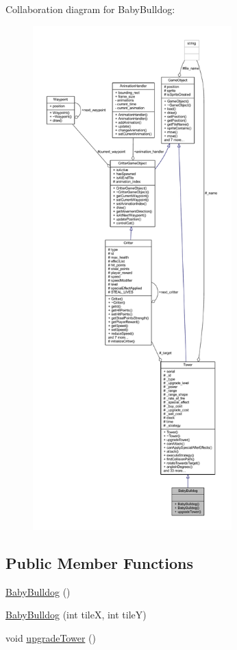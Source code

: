 Collaboration diagram for Baby\+Bulldog\+:
\nopagebreak
\begin{figure}[H]
\begin{center}
\leavevmode
\includegraphics[height=550pt]{class_baby_bulldog__coll__graph}
\end{center}
\end{figure}
\subsection*{Public Member Functions}
\begin{DoxyCompactItemize}
\item 
\hyperlink{class_baby_bulldog_a58ec67bd22716eac5303165b780ca86e}{Baby\+Bulldog} ()
\item 
\hyperlink{class_baby_bulldog_adb01b9d1b5b21f1caf39d3eb737646a4}{Baby\+Bulldog} (int tile\+X, int tile\+Y)
\item 
void \hyperlink{class_baby_bulldog_a9eeb823fad3dc485958dc587f533f7a8}{upgrade\+Tower} ()
\end{DoxyCompactItemize}
